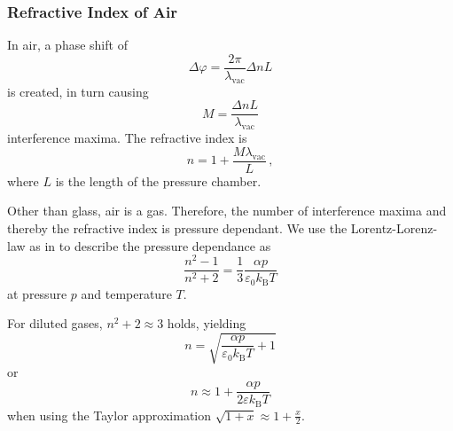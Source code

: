 \subsubsection{Refractive Index of Air}

In air, a phase shift of
\begin{equation*}
    \Delta \varphi = \frac{2 \pi}{\lambda_\text{vac}} \Delta n L 
\end{equation*}
is created, in turn causing
\begin{equation*}
    M = \frac{\Delta n L}{\lambda_\text{vac}}
\end{equation*}
interference maxima.
The refractive index is
\begin{equation}
    n = 1 + \frac{M \lambda_\text{vac}}{L} \,,
    \label{eq:refractiveindexairExp}
\end{equation}
where $L$ is the length of the pressure chamber.

Other than glass, air is a gas. 
Therefore, the number of interference maxima and thereby the refractive index is pressure dependant.
We use the Lorentz-Lorenz-law as in \cite{lololaw} to describe the pressure dependance as
\begin{equation*}
    \frac{n^2 - 1}{n^2 + 2} = \frac{1}{3} \frac{\alpha p}{\varepsilon_0 k_\text{B} T}
\end{equation*}
at pressure $p$ and temperature $T$.

For diluted gases, $n^2 + 2 \approx 3$ holds, yielding
\begin{equation}
    n = \sqrt{\frac{\alpha p}{\varepsilon_0 k_\text{B} T} + 1}
    \label{eq:LLL}
\end{equation}
or
\begin{equation}
    n \approx 1 + \frac{\alpha p}{2 \varepsilon k_\text{B} T}
    \label{eq:refractiveindexair}
\end{equation}
when using the Taylor approximation $\sqrt{1 + x} \approx 1 + \frac{x}{2}$.




